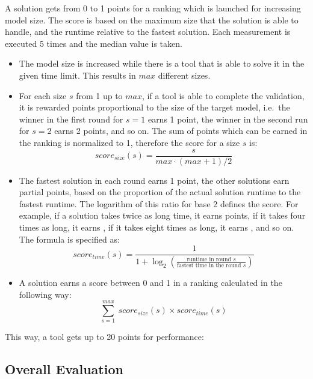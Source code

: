 \documentclass[submission,copyright,creativecommons]{eptcs}
\begin{document}
A solution gets from 0 to 1 points for a ranking which is launched for increasing model size. The score is based on the maximum size that the solution is able to handle, and the runtime relative to the fastest solution. Each measurement is executed 5 times and the median value is taken.
\begin{itemize}
  \item The model size is increased while there is a tool that is able to solve it in the given time limit. This results in $\mathit{max}$ different sizes.
  \item For each size $\mathit{s}$ from 1 up to $\mathit{max}$, if a tool is able to complete the validation, it is rewarded points proportional to the size of the target model, i.e.\ the winner in the first round for $\mathit{s}=1$ earns 1 point, the winner in the second run for $s=2$ earns 2 points, and so on. The sum of points which can be earned in the ranking is normalized to 1, therefore the score for a size $s$ is:
  \[ \mathit{score}_\mathit{size}(s)= \frac{s}{\mathit{max}\cdot(\mathit{max}+1)/2} \]
  \item The fastest solution in each round earns 1 point, the other solutions earn partial points, based on the proportion of the actual solution runtime to the fastest runtime. The logarithm of this ratio for base 2 defines the score. For example, if a solution takes twice as long time, it earns  points, if it takes four times as long, it earns , if it takes eight times as long, it earns , and so on. The formula is specified as:
    \[ %
  \mathit{score}_\mathit{time}(s)=\frac{1}{1+\log_2\left(\frac{\text{runtime in round $s$}}{\text{fastest time in the round $s$}}\right)} \]
  \item A solution earns a score between 0 and 1 in a ranking calculated in the following way:
\[\sum^{\mathit{max}}_{s=1} \ \mathit{score}_\mathit{size}(s) \times \mathit{score}_\mathit{time}(s) \]
\end{itemize}

This way, a tool gets up to 20 points for performance:

\noindent{}

\subsection{Overall Evaluation}
\end{document}
